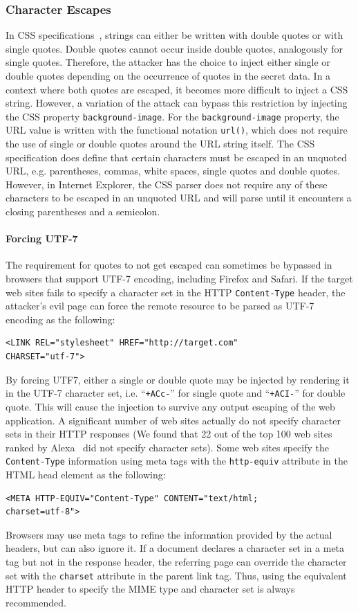 \documentclass{acm_proc_article-sp}
\begin{document}
\subsubsection{Character Escapes}
In CSS specifications~\cite{css}, strings can either be written with double quotes or with single quotes. Double quotes cannot occur inside double quotes, analogously for single quotes. Therefore, the attacker has the choice to inject either single or double quotes depending on the occurrence of quotes in the secret data. In a context where both quotes are escaped, it becomes more difficult to inject a CSS string. However, a variation of the attack  can bypass this restriction by injecting the CSS property \texttt{background-image}. For the \texttt{background-image} property, the URL value is written with the functional notation \texttt{url()}, which does not require the use of single or double quotes around the URL string itself. The CSS specification does define that certain characters must be escaped in an unquoted URL, e.g. parentheses, commas, white spaces, single quotes and double quotes. However, in Internet Explorer, the CSS parser does not require any of these characters to be escaped in an unquoted URL and will parse until it encounters a closing parentheses and a semicolon.

\paragraph{Forcing UTF-7}
The requirement for quotes to not get escaped can sometimes be bypassed in browsers that support UTF-7 encoding, including Firefox and Safari. If the target web sites fails to specify a character set in the HTTP \texttt{Content-Type} header, the attacker's evil page can force the remote resource to be parsed as UTF-7 encoding as the following:
\begin{verbatim}
<LINK REL="stylesheet" HREF="http://target.com"
CHARSET="utf-7">
\end{verbatim}
By forcing UTF7, either a single or double quote may be injected by rendering it in the UTF-7 character set, i.e. ``\texttt{+ACc-}'' for single quote and ``\texttt{+ACI-}'' for double quote. This will cause the injection to survive any output escaping of the web application. A significant number of web sites actually do not specify character sets in their HTTP responses (We found that 22 out of the top 100 web sites ranked by Alexa~\cite{alexa} did not specify character sets). Some web sites specify the \texttt{Content-Type} information using meta tags with the \texttt{http-equiv} attribute in the HTML head element as the following:
\begin{verbatim}
<META HTTP-EQUIV="Content-Type" CONTENT="text/html;
charset=utf-8">
\end{verbatim}
Browsers may use meta tags to refine the information provided by the actual headers, but can also ignore it. If a document declares a character set in a meta tag but not in the response header, the referring page can override the character set with the \texttt{charset} attribute in the parent link tag. Thus, using the equivalent HTTP header to specify the MIME type and character set is always recommended.
\end{document}
